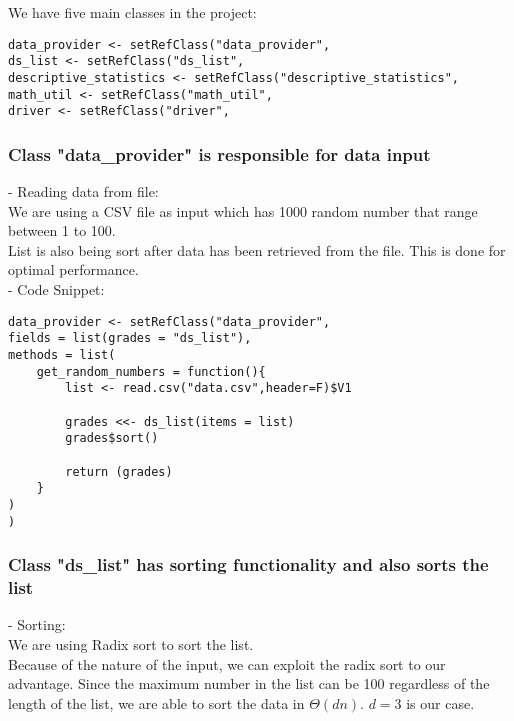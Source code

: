 \documentclass[11pt]{article}
\begin{document}
We have five main classes in the project:\\

\begin{lstlisting}
data_provider <- setRefClass("data_provider",
ds_list <- setRefClass("ds_list",
descriptive_statistics <- setRefClass("descriptive_statistics", 
math_util <- setRefClass("math_util",
driver <- setRefClass("driver",

\end{lstlisting}

\subsubsection{Class "data\_provider" is responsible for data input}

- Reading data from file:\\

We are using a CSV file as input which has 1000 random number that range between 1 to 100.\\

List is also being sort after data has been retrieved from the file. This is done for optimal performance.\\

- Code Snippet:\\

\begin{lstlisting}
data_provider <- setRefClass("data_provider",
fields = list(grades = "ds_list"),
methods = list(
    get_random_numbers = function(){
        list <- read.csv("data.csv",header=F)$V1

        grades <<- ds_list(items = list)
        grades$sort()
        
        return (grades)
    }
)
)
\end{lstlisting}

\subsubsection{Class "ds\_list" has sorting functionality and also sorts the list}

- Sorting:\\

We are using Radix sort to sort the list.\\

Because of the nature of the input, we can exploit the radix sort to our advantage. Since the maximum number in the list can be 100 regardless of the length of the list, we are able to sort the data in $\Theta(dn)$. $d=3$ is our case.\\
\end{document}
